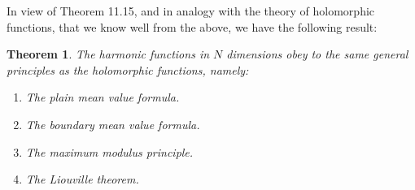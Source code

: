 \documentclass[12pt]{amsbook}
\newtheorem{theorem}{Theorem}[chapter]
\begin{document}
In view of Theorem 11.15, and in analogy with the theory of holomorphic functions, that we know well from the above, we have the following result:


\begin{theorem}
The harmonic functions in $N$ dimensions obey to the same general principles as the holomorphic functions, namely:
\begin{enumerate}
\item The plain mean value formula. 

\item The boundary mean value formula.

\item The maximum modulus principle.

\item The Liouville theorem.
\end{enumerate}
\end{theorem}
\end{document}

